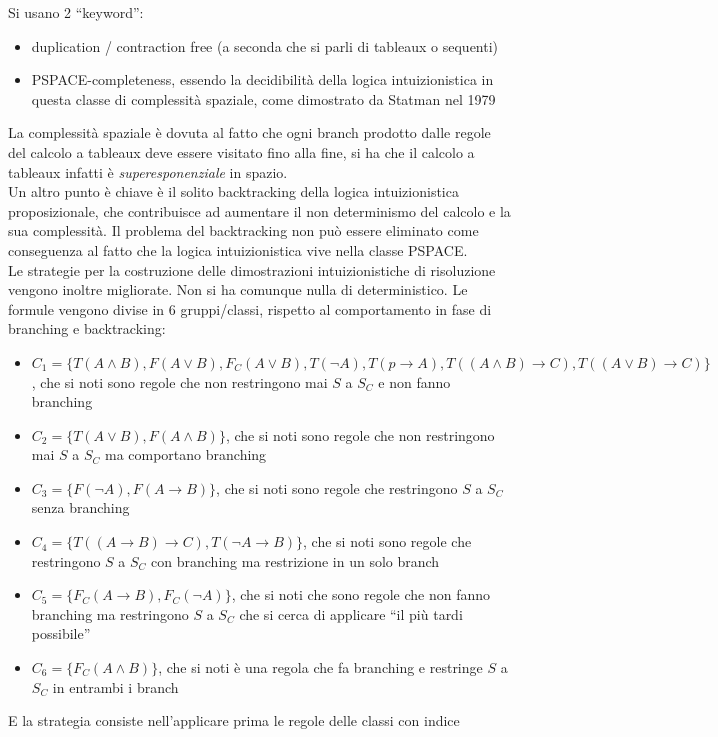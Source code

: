\documentclass[a4paper,12pt, oneside]{book}
\begin{document}
Si usano 2 ``keyword'':
\begin{itemize}
  \item duplication / contraction free (a seconda che si parli di tableaux o
  sequenti) 
  \item PSPACE-completeness, essendo la decidibilità della logica
  intuizionistica in questa classe di complessità spaziale, come dimostrato da
  Statman nel 1979
\end{itemize}
La complessità spaziale è dovuta al fatto che ogni branch prodotto dalle regole
del calcolo a tableaux deve essere visitato fino alla fine, si ha che il calcolo
a tableaux infatti è \textit{superesponenziale} in spazio.\\
Un altro punto è chiave è il solito backtracking della logica intuizionistica
proposizionale, che contribuisce ad aumentare il non determinismo del calcolo e
la sua complessità. Il problema del backtracking non può essere eliminato come
conseguenza al fatto che la logica intuizionistica vive nella classe PSPACE.\\
Le strategie per la costruzione delle dimostrazioni intuizionistiche di
risoluzione vengono inoltre migliorate. Non si ha comunque nulla di
deterministico. Le formule vengono divise in 6 gruppi/classi, rispetto al
comportamento in fase di branching e backtracking:
\begin{itemize}
  \item $C_1=\{T(A\land B), F(A\lor B), F_C(A\lor B), T(\neg A),T(p\to A),
  T((A\land B)\to C), T((A\lor B)\to C)\}$, che si noti sono regole che non
  restringono mai $S$ a $S_C$ e non fanno branching
  \item $C_2=\{T(A\lor B), F(A\land B)\}$, che si noti sono regole che non
  restringono mai $S$ a $S_C$ ma comportano branching
  \item $C_3=\{F(\neg A), F(A\to B)\}$, che si noti sono regole che restringono
  $S$ a $S_C$ senza branching
  \item $C_4=\{T((A\to B)\to C), T(\neg A\to B)\}$, che si noti sono regole che
  restringono $S$ a $S_C$ con branching ma restrizione in un solo branch
  \item $C_5=\{F_C(A\to B), F_C(\neg A)\}$, che si noti che sono regole che non
  fanno branching ma restringono $S$ a $S_C$ che si cerca di applicare ``il più
  tardi possibile''
  \item $C_6=\{F_C(A\land B)\}$, che si noti è una regola che fa branching e
  restringe $S$ a $S_C$ in entrambi i branch
\end{itemize}
E la strategia consiste nell'applicare prima le regole delle classi con indice
\end{document}
